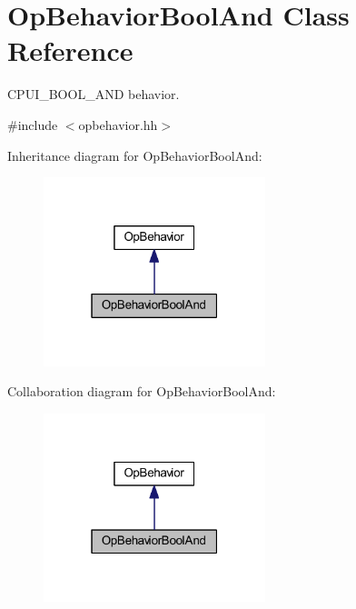 \hypertarget{class_op_behavior_bool_and}{}\section{Op\+Behavior\+Bool\+And Class Reference}
\label{class_op_behavior_bool_and}


C\+P\+U\+I\+\_\+\+B\+O\+O\+L\+\_\+\+A\+ND behavior.  




{\ttfamily \#include $<$opbehavior.\+hh$>$}



Inheritance diagram for Op\+Behavior\+Bool\+And\+:
\nopagebreak
\begin{figure}[H]
\begin{center}
\leavevmode
\includegraphics[width=183pt]{class_op_behavior_bool_and__inherit__graph}
\end{center}
\end{figure}


Collaboration diagram for Op\+Behavior\+Bool\+And\+:
\nopagebreak
\begin{figure}[H]
\begin{center}
\leavevmode
\includegraphics[width=183pt]{class_op_behavior_bool_and__coll__graph}
\end{center}
\end{figure}
